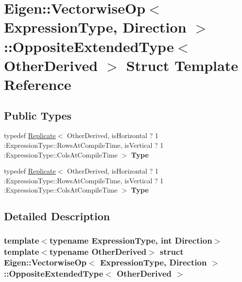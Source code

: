 \hypertarget{struct_eigen_1_1_vectorwise_op_1_1_opposite_extended_type}{}\section{Eigen\+:\+:Vectorwise\+Op$<$ Expression\+Type, Direction $>$\+:\+:Opposite\+Extended\+Type$<$ Other\+Derived $>$ Struct Template Reference}
\label{struct_eigen_1_1_vectorwise_op_1_1_opposite_extended_type}
\subsection*{Public Types}
\begin{DoxyCompactItemize}
\item 
\mbox{\label{struct_eigen_1_1_vectorwise_op_1_1_opposite_extended_type_a76d7744eef659dd1578fe35fc8e3692b}} 
typedef \hyperlink{group___core___module_class_eigen_1_1_replicate}{Replicate}$<$ Other\+Derived, is\+Horizontal ? 1 \+:Expression\+Type\+::\+Rows\+At\+Compile\+Time, is\+Vertical ? 1 \+:Expression\+Type\+::\+Cols\+At\+Compile\+Time $>$ {\bfseries Type}
\item 
\mbox{\label{struct_eigen_1_1_vectorwise_op_1_1_opposite_extended_type_a76d7744eef659dd1578fe35fc8e3692b}} 
typedef \hyperlink{group___core___module_class_eigen_1_1_replicate}{Replicate}$<$ Other\+Derived, is\+Horizontal ? 1 \+:Expression\+Type\+::\+Rows\+At\+Compile\+Time, is\+Vertical ? 1 \+:Expression\+Type\+::\+Cols\+At\+Compile\+Time $>$ {\bfseries Type}
\end{DoxyCompactItemize}


\subsection{Detailed Description}
\subsubsection*{template$<$typename Expression\+Type, int Direction$>$\newline
template$<$typename Other\+Derived$>$\newline
struct Eigen\+::\+Vectorwise\+Op$<$ Expression\+Type, Direction $>$\+::\+Opposite\+Extended\+Type$<$ Other\+Derived $>$}



